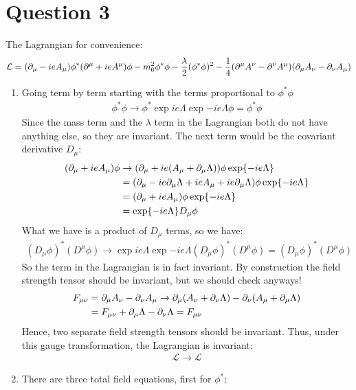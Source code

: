 \documentclass[12pt]{article}
\renewcommand{\L}{\mathcal{L}}
\newcommand{\D}{\partial}
\begin{document}
\section*{Question 3}
The Lagrangian for convenience:
\begin{align*}
  \L=\qty(\D_\mu-ieA_\mu)\phi^*\qty(\D^\mu+ieA^\mu)\phi
  -m_0^2\phi^*\phi-\frac{\lambda}{2}(\phi^*\phi)^2
  -\frac{1}{4}\qty(\D^\mu A^\nu-\D^\nu A^\mu)\qty(\D_\mu A_\nu-\D_\nu A_\mu)
\end{align*}
\begin{enumerate}
\item Going term by term starting with the terms proportional to $\phi^*\phi$
  \begin{align*}
    \phi^*\phi\to\phi^*\exp{ie\Lambda}\exp{-ie\Lambda}\phi=\phi^*\phi
  \end{align*}
  Since the mass term and the $\lambda$ term in the Lagrangian both do not have anything else, so they are invariant. The next term would be the covariant derivative $D_\mu$:
  \begin{align*}
    (\D_\mu+ieA_\mu)\phi&\to(\D_\mu+ie\qty(A_\mu+\D_\mu\Lambda))
    \phi\exp{-ie\Lambda}\\
    &=(\D_\mu-ie\D_\mu\Lambda+ieA_\mu+ie\D_\mu\Lambda)\phi\exp{-ie\Lambda}\\
    &=(\D_\mu+ieA_\mu)\phi\exp{-ie\Lambda}\\
    &=\exp{-ie\Lambda}D_\mu\phi
  \end{align*}
  What we have is a product of $D_\mu$ terms, so we have:
  \begin{align*}
    (D_\mu\phi)^*(D^\mu\phi)\to\exp{ie\Lambda}\exp{-ie\Lambda}
    (D_\mu\phi)^*(D^\mu\phi)=(D_\mu\phi)^*(D^\mu\phi)
  \end{align*}
  So the term in the Lagrangian is in fact invariant. By construction the field strength tensor should be invariant, but we should check anyways!
  \begin{align*}
    F_{\mu\nu}&=\D_\mu A_\nu-\D_\nu A_\mu\to
    \D_\mu\qty(A_\nu+\D_\nu\Lambda)-\D_\nu\qty(A_\mu+\D_\mu\Lambda)\\
    &=F_{\mu\nu}+\D_\mu\Lambda-\D_\nu\Lambda=F_{\mu\nu}
  \end{align*}
  Hence, two separate field strength tensors should be invariant. Thus, under this gauge transformation, the Lagrangian is invariant:
  \begin{align*}
    \boxed{\L\to\L}
  \end{align*}
\item There are three total field equations, first for $\phi^*$:

\end{enumerate}
\end{document}
